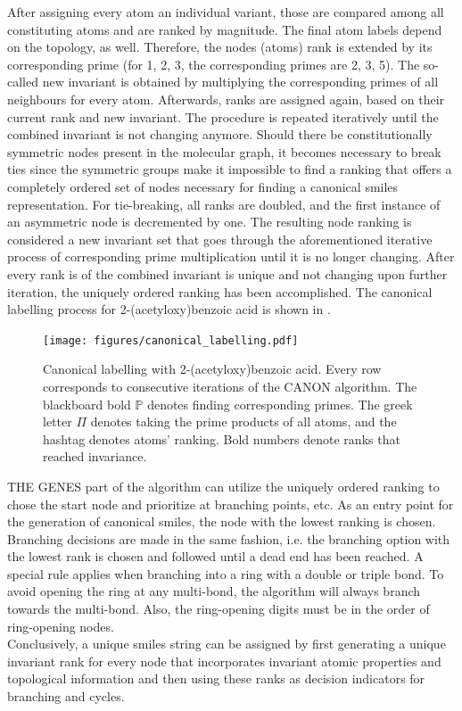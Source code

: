 After assigning every atom an individual variant, those are compared among all constituting atoms and are ranked by magnitude. The final atom labels depend on the topology, as well. Therefore, the nodes (atoms) rank is extended by its corresponding prime (for 1, 2, 3, the corresponding primes are 2, 3, 5). The so-called new invariant is obtained by multiplying the corresponding primes of all neighbours for every atom. Afterwards, ranks are assigned again, based on their current rank and new invariant. The procedure is repeated iteratively until the combined invariant is not changing anymore. Should there be constitutionally symmetric nodes present in the molecular graph, it becomes necessary to break ties since the symmetric groups make it impossible to find a ranking that offers a completely ordered set of nodes necessary for finding a canonical \ac{smiles} representation. For tie-breaking, all ranks are doubled, and the first instance of an asymmetric node is decremented by one. The resulting node ranking is considered a new invariant set that goes through the aforementioned iterative process of corresponding prime multiplication until it is no longer changing. After every rank is of the combined invariant is unique and not changing upon further iteration, the uniquely ordered ranking has been accomplished.\cite{Weininger1989} The canonical labelling process for 2-(acetyloxy)benzoic acid is shown in .
\begin{figure}[H]
	\centering
	\texttt{[image: figures/canonical\_labelling.pdf]}
	\caption[Canonical Labelling with 2-(Acetyloxy)Benzoic Acid]{Canonical labelling with 2-(acetyloxy)benzoic acid. Every row corresponds to consecutive iterations of the CANON algorithm. The blackboard bold $\mathbb{P}$ denotes finding corresponding primes. The greek letter $\Pi$ denotes taking the prime products of all atoms, and the hashtag denotes atoms' ranking. Bold numbers denote ranks that reached invariance.}
	\label{fig:canonicallabelling}	
\end{figure}\noindent
THE GENES part of the algorithm can utilize the uniquely ordered ranking to chose the start node and prioritize at branching points, etc. As an entry point for the generation of canonical \ac{smiles}, the node with the lowest ranking is chosen. Branching decisions are made in the same fashion, i.e. the branching option with the lowest rank is chosen and followed until a dead end has been reached. A special rule applies when branching into a ring with a double or triple bond. To avoid opening the ring at any multi-bond, the algorithm will always branch towards the multi-bond. Also, the ring-opening digits must be in the order of ring-opening nodes.\\
Conclusively, a unique \ac{smiles} string can be assigned by first generating a unique invariant rank for every node that incorporates invariant atomic properties and topological information and then using these ranks as decision indicators for branching and cycles.\cite{Weininger1989}
%
%
